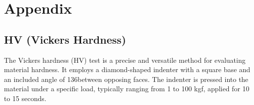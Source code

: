 \documentclass{article}
\begin{document}
    
    
    

    \newpage\vspace*{-5pt}
    
   
    
\section{Appendix}
\normalsize
\renewcommand{\thesubsection}{\Alph{subsection}}
\subsection{HV (Vickers Hardness)}  
    The Vickers hardness (HV) test is a precise and versatile method for evaluating material hardness. It employs a diamond-shaped indenter with a square base and an included angle of 136\textdegree between opposing faces. 
    The indenter is pressed into the material under a specific load, typically ranging from 1 to 100 kgf, applied for 10 to 15 seconds.
\end{document}
